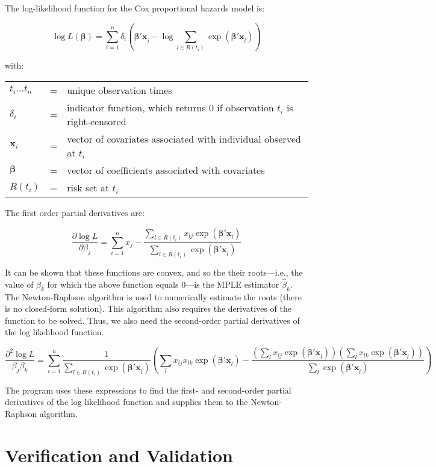 \documentclass{article}
\begin{document}
The log-likelihood function for the Cox proportional hazards model is:

\begin{equation}
\log L(\bm{\beta}) = \sum_{i=1}^n \delta_i \left( \bm{\beta'x}_i - \log \sum_{l
\in R(t_i)} \exp{(\bm{\beta' x}_l)}\right)
\end{equation}

with:
\begin{tabular}{l c l}
$t_i...t_n$ & = & unique observation times \\
$\delta_i$ & = & indicator function, which returns 0 if observation $t_i$ is
right-censored \\
$\bm{x}_i$ & = & vector of covariates associated with individual observed at
$t_i$ \\
$\bm{\beta}$ & = & vector of coefficients associated with covariates \\
$R(t_i)$ & = & risk set at $t_i$
\end{tabular}

\bigskip

The first order partial derivatives are:

\begin{equation}
\frac{\partial \log L}{\partial \beta_j} = 
\sum_{i=1}^n x_j - \frac{\sum_{l \in R(t_i)} x_{lj} \exp(\bm{\beta'x}_l)}{ \sum_{l
\in R(t_i)} \exp(\bm{\beta'x}_l)}
\end{equation}

It can be shown that these functions are convex, and so the their roots---i.e.,
the value of $\beta_k$ for which the above function equals 0---is the MPLE
estimator $\hat{\beta}_k$. The Newton-Raphson algorithm is used to numerically
estimate the roots (there is no closed-form solution). This algorithm also
requires the derivatives of the function to be solved. Thus, we also need the
second-order partial derivatives of the log likelihood function.

\begin{equation}
\frac{\partial^2 \log L}{\beta_j \beta_k} = 
\sum_{i=1}^n 
\frac{1}{\sum_{l \in R(t_i)} \exp(\bm{\beta'x}_l)}
\left(
\sum_l x_{lj}x_{lk} \exp(\bm{\beta'x}_l)- 
\frac{
\left(\sum_l x_{lj} \exp(\bm{\beta'x}_l)\right)
\left(\sum_l x_{lk} \exp(\bm{\beta'x}_l)\right)
}
{\sum_l \exp(\bm{\beta'x}_l)}
\right)
\end{equation}

The program uses these expressions to find the first- and second-order partial
derivatives of the log likelihood function and supplies them to the
Newton-Raphson algorithm.

\section*{Verification and Validation}
\end{document}
